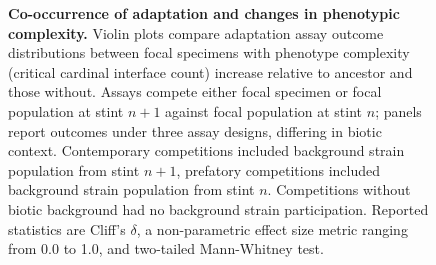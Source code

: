 \begin{figure}
\caption{
    \textbf{Co-occurrence of adaptation and changes in phenotypic complexity.}
    \footnotesize
    Violin plots compare adaptation assay outcome distributions between focal specimens with phenotype complexity (critical cardinal interface count) increase relative to ancestor and those without.
    Assays compete either focal specimen or focal population at stint $n+1$ against focal population at stint $n$;
    panels report outcomes under three assay designs, differing in biotic context.
    Contemporary competitions included background strain population from stint $n+1$, prefatory competitions included background strain population from stint $n$.
    Competitions without biotic background had no background strain participation.
    Reported statistics are Cliff's $\delta$, a non-parametric effect size metric ranging from 0.0 to 1.0, and two-tailed Mann-Whitney test.
}
\label{fig:fitness-pcomplexity}

\end{figure}

